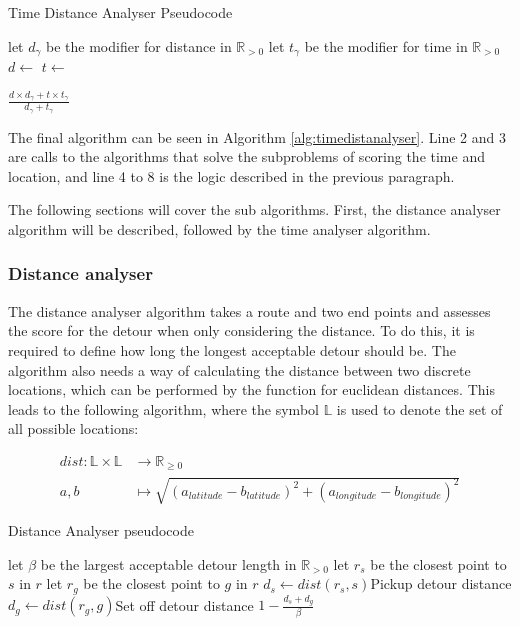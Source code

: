 \begin{algorithm}
	\caption{Time Distance Analyser Pseudocode}
	\label{alg:timedistanalyser}
	\begin{algorithmic}[1]
		\Require 
		\Statex let $d_\gamma$ be the modifier for distance in $\mathbb{R}_{>0}$
		\Statex let $t_\gamma$ be the modifier for time in $\mathbb{R}_{>0}$
		\Statex 
			\State $d\gets$
			\State $t\gets$
			
				\State \Return $\frac{d\times d_\gamma+t\times t_\gamma}{d_\gamma+t_\gamma}$
			\Else
				\State{}
			\EndIf
		\EndFunction
	\end{algorithmic}
\end{algorithm}

The final algorithm can be seen in Algorithm \ref{alg:timedistanalyser}.
Line 2 and 3 are calls to the algorithms that solve the subproblems of scoring the time and location, and line 4 to 8 is the logic described in the previous paragraph.

The following sections will cover the sub algorithms.
First, the distance analyser algorithm will be described, followed by the time analyser algorithm.

\subsubsection{Distance analyser}
The distance analyser algorithm takes a route and two end points and assesses the score for the detour when only considering the distance.
To do this, it is required to define how long the longest acceptable detour should be.
The algorithm also needs a way of calculating the distance between two discrete locations, which can be performed by the function for euclidean distances.
This leads to the following algorithm, where the symbol $\mathbb{L}$ is used to denote the set of all possible locations:

\begin{align*}
	dist : \mathbb{L}\times\mathbb{L} &\rightarrow \mathbb{R}_{\geq 0}\\
	a, b &\mapsto \sqrt{(a_{latitude} - b_{latitude})^2 + (a_{longitude} - b_{longitude})^2}
\end{align*}

\begin{algorithm}
	\caption{Distance Analyser pseudocode}
	\label{alg:distanalyser}
	\begin{algorithmic}[1]
		\Require 
		\Statex let $\beta$ be the largest acceptable detour length in $\mathbb{R}_{>0}$ 
		\Statex 
			\State let $r_s$ be the closest point to $s$ in $r$
			\State let $r_g$ be the closest point to $g$ in $r$
			\State $d_s\gets dist(r_s, s)$\Comment Pickup detour distance
			\State $d_g\gets dist(r_g, g)$\Comment Set off detour distance
			\State\Return $1-\frac{d_s + d_g}{\beta}$
		\EndFunction
	\end{algorithmic}
\end{algorithm}

